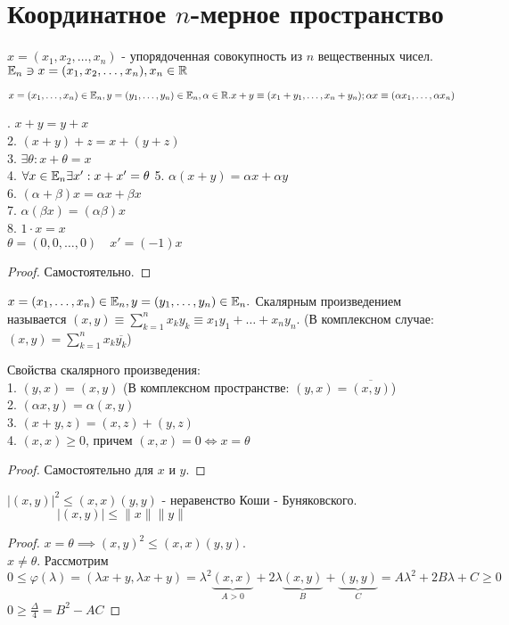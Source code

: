 \documentclass[../main.tex]{subfiles}
\begin{document}
\section{Координатное $n$-мерное пространство}
\begin{definition}
    $x=(x_{1},x_{2},\dots,x_{n})$ - упорядоченная совокупность из $n$ вещественных чисел. $\mathbb{E}_{n} \ni x=(x_{1},x_{2},\dots,x_{n}), x_{n}\in\mathbb{R} $
 \end{definition}
\begin{definition}
    $x=(x_{1},\dots,x_{n})\in \mathbb{E}_{n}, y = (y_{1},\dots,y_{n})\in\mathbb{E}_{n},\alpha\in\mathbb{R}. x+y \equiv (x_{1}+y_{1},\dots,x_{n}+y_{n}); \alpha x \equiv (\alpha x_{1},\dots,\alpha x_{n})$
\end{definition}
. $x+y = y+ x$\\ 
2. $(x+y)+z = x+(y+z)$\\ 
3. $\exists \theta : x+\theta = x$\\ 
4. $\forall x\in\mathbb{E}_{n} \exists x':x+x'=\theta$
5. $\alpha(x+y) = \alpha x + \alpha y$\\
6. $(\alpha+\beta)x = \alpha x + \beta x$\\
7. $\alpha(\beta x) = (\alpha\beta)x$\\
8. $1\cdot x = x$
\\$\theta = (0,0,\dots,0)\quad x' = (-1)x$
\begin{proof}
    Самостоятельно.
\end{proof}
\begin{definition}
    $x=(x_{1},\dots,x_{n})\in \mathbb{E}_{n}, y = (y_{1},\dots,y_{n})\in\mathbb{E}_{n}.$ Скалярным произведением называется $(x,y)\equiv\sum_{k=1}^{n  } x_{k}y_{k} \equiv x_{1}y_{1}+\dots+x_{n}y_{n}$. (В комплексном случае: $(x,y)=\sum_{k=1}^{n}x_{k}\overline{y_{k}} $)
\end{definition}
Свойства скалярного произведения:
\\1. $(y,x)= (x,y)$ (В комплексном пространстве: $(y,x)=\overline{(x,y)}$)
\\2. $(\alpha x,y)= \alpha(x,y)$
\\3. $(x+y,z)= (x,z)+(y,z)$
\\4. $(x,x)\geqslant 0$, причем $(x,x) = 0 \Leftrightarrow x = \theta$ 
\begin{proof}
    Самостоятельно для $x$ и $y$.
\end{proof}
    $|(x,y)|^{2}\leqslant (x,x)(y,y)$ - неравенство Коши - Буняковского.$\qquad \qquad|(x,y)| \leqslant \|x\|\|y\|$
\begin{proof}
    $x = \theta \implies (x,y)^{2} \leqslant (x,x)(y,y)$. 
    \\$x\neq \theta$. Рассмотрим $0\leqslant\varphi(\lambda) = (\lambda x + y, \lambda x +y) = \lambda^{2} \underbrace{(x,x)}_{A>0}+2\lambda\underbrace{(x,y)}_{B}+\underbrace{(y,y)}_{C} = A\lambda^{2} + 2B \lambda + C \geqslant 0$
    \\ $0\geqslant \frac{\Delta}{4} = B^{2} - AC$
\end{proof}
\end{document}
